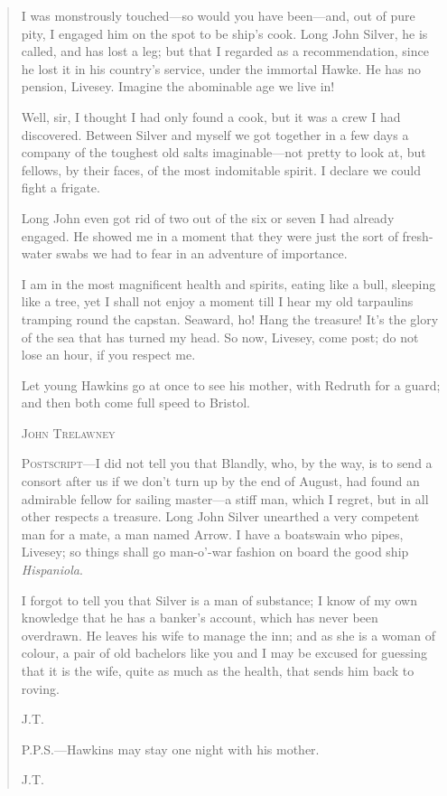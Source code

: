 \begin{quotation}
I was monstrously touched---so would you have been---and, out of pure pity, I engaged him on the spot to be ship’s cook. Long John Silver, he is called, and has lost a leg; but that I regarded as a recommendation, since he lost it in his country’s service, under the immortal Hawke. He has no pension, Livesey. Imagine the abominable age we live in!

Well, sir, I thought I had only found a cook, but it was a crew I had discovered. Between Silver and myself we got together in a few days a company of the toughest old salts imaginable---not pretty to look at, but fellows, by their faces, of the most indomitable spirit. I declare we could fight a frigate.


Long John even got rid of two out of the six or seven I had already engaged. He showed me in a moment that they were just the sort of fresh-water swabs we had to fear in an adventure of importance.

I am in the most magnificent health and spirits, eating like a bull, sleeping like a tree, yet I shall not enjoy a moment till I hear my old tarpaulins tramping round the capstan. Seaward, ho! Hang the treasure! It’s the glory of the sea that has turned my head. So now, Livesey, come post; do not lose an hour, if you respect me.

Let young Hawkins go at once to see his mother, with Redruth for a guard; and then both come full speed to Bristol.
\begin{flushright}
\textsc{John Trelawney}
\end{flushright}
\enlargethispage{2\baselineskip}


\textsc{Postscript}---I did not tell you that Blandly, who, by the way, is to send a consort after us if we don’t turn up by the end of August, had found an admirable fellow for sailing master---a stiff man, which I regret, but in all other respects a treasure. Long John Silver unearthed a very competent man for a mate, a man named Arrow. I have a boatswain who pipes, Livesey; so things shall go man-o’-war fashion on board the good ship \textit{Hispaniola}.

I forgot to tell you that Silver is a man of substance; I know of my own knowledge that he has a banker’s account, which has never been overdrawn. He leaves his wife to manage the inn; and as she is a woman of colour, a pair of old bachelors like you and I may be excused for guessing that it is the wife, quite as much as the health, that sends him back to roving.
\begin{flushright}
\textsc{J.T.}
\end{flushright}

\textsc{P.P.S.}---Hawkins may stay one night with his mother.\\
\begin{flushright}
\textsc{J.T.}
\end{flushright}

\end{quotation}

